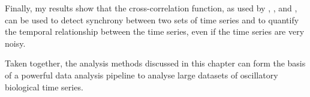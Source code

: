 Finally, my results show that the cross-correlation function, as used by \textcite{dunlopRegulatoryActivityRevealed2008}, \textcite{kivietStochasticityMetabolismGrowth2014}, and \textcite{pietschDeterminingGrowthRates2023}, can be used to detect synchrony between two sets of time series and to quantify the temporal relationship between the time series, even if the time series are very noisy.

Taken together, the analysis methods discussed in this chapter can form the basis of a powerful data analysis pipeline to analyse large datasets of oscillatory biological time series.

